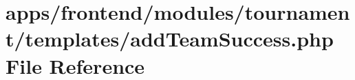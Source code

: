 \hypertarget{frontend_2modules_2tournament_2templates_2add_team_success_8php}{\section{apps/frontend/modules/tournament/templates/add\-Team\-Success.php File Reference}
\label{frontend_2modules_2tournament_2templates_2add_team_success_8php}
}

